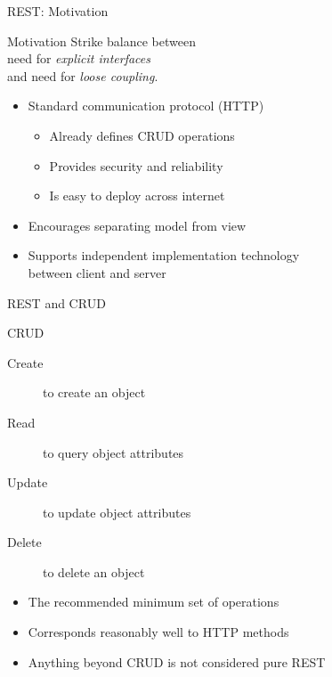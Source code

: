 \begin{frame}{REST: Motivation}
    \begin{block}{Motivation}
        Strike balance between \\ need for \emph{explicit interfaces} \\ and need for \emph{loose coupling}.
    \end{block}

    \medskip

    \begin{itemize}
        \item Standard communication protocol (HTTP)
        \begin{itemize}
            \item Already defines CRUD operations
            \item Provides security and reliability
            \item Is easy to deploy across internet
        \end{itemize}
        \item Encourages separating model from view
        \item Supports independent implementation technology \\ between client and server
    \end{itemize}
\end{frame}


\begin{frame}{REST and CRUD}
    \begin{block}{CRUD}
        \begin{description}
             \item[Create] to create an object
             \item[Read] to query object attributes
             \item[Update] to update object attributes
             \item[Delete] to delete an object
        \end{description}
    \end{block}

    \medskip

    \begin{itemize}
        \item The recommended minimum set of operations
        \item Corresponds reasonably well to HTTP methods
        \item Anything beyond CRUD is not considered pure REST
    \end{itemize}
\end{frame}


